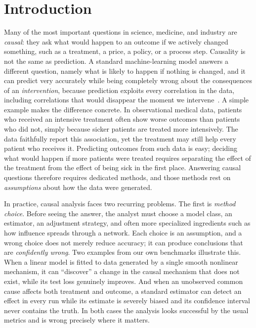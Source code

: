 \documentclass[electronics,article,submit,oneauthor]{Definitions/mdpi}
\begin{document}
\section{Introduction}\label{sec:introduction}

Many of the most important questions in science, medicine, and industry are \emph{causal}: they ask what would happen to an outcome if we actively changed something, such as a treatment, a price, a policy, or a process step. Causality is not the same as prediction. A standard machine-learning model answers a different question, namely what is likely to happen if nothing is changed, and it can predict very accurately while being completely wrong about the consequences of an \emph{intervention}, because prediction exploits every correlation in the data, including correlations that would disappear the moment we intervene~\cite{pearl2009causality,hernan2020whatif}. A simple example makes the difference concrete. In observational medical data, patients who received an intensive treatment often show worse outcomes than patients who did not, simply because sicker patients are treated more intensively. The data faithfully report this association, yet the treatment may still help every patient who receives it. Predicting outcomes from such data is easy; deciding what would happen if more patients were treated requires separating the effect of the treatment from the effect of being sick in the first place. Answering causal questions therefore requires dedicated methods, and those methods rest on \emph{assumptions} about how the data were generated.

In practice, causal analysis faces two recurring problems. The first is \emph{method choice}. Before seeing the answer, the analyst must choose a model class, an estimator, an adjustment strategy, and often more specialized ingredients such as how influence spreads through a network. Each choice is an assumption, and a wrong choice does not merely reduce accuracy; it can produce conclusions that are \emph{confidently wrong}. Two examples from our own benchmarks illustrate this. When a linear model is fitted to data generated by a single smooth nonlinear mechanism, it can ``discover'' a change in the causal mechanism that does not exist, while its test loss genuinely improves. And when an unobserved common cause affects both treatment and outcome, a standard estimator can detect an effect in every run while its estimate is severely biased and its confidence interval never contains the truth. In both cases the analysis looks successful by the usual metrics and is wrong precisely where it matters.
\end{document}
